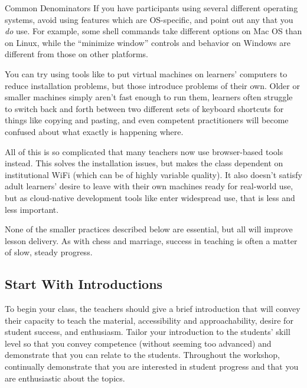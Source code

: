 \begin{aside}{Common Denominators}
  If you have participants using several different operating systems,
  avoid using features which are OS-specific, and point out any that you
  \emph{do} use. For example, some shell commands take different options on
  Mac OS than on Linux, while the ``minimize window'' controls and
  behavior on Windows are different from those on other platforms.
\end{aside}

You can try using tools like  to put virtual machines
on learners' computers to reduce installation problems, but those
introduce problems of their own. Older or smaller machines simply
aren't fast enough to run them, learners often struggle to switch back
and forth between two different sets of keyboard shortcuts for things
like copying and pasting, and even competent practitioners will become
confused about what exactly is happening where.

All of this is so complicated that many teachers now use browser-based
tools instead. This solves the installation issues, but makes the
class dependent on institutional WiFi (which can be of highly variable
quality). It also doesn't satisfy adult learners' desire to leave with
their own machines ready for real-world use, but as cloud-native
development tools like  enter widespread use, that is
less and less important.


None of the smaller practices described below are essential, but all
will improve lesson delivery. As with chess and marriage, success in
teaching is often a matter of slow, steady progress.

\subsection*{Start With Introductions}

To begin your class, the teachers should give a brief introduction that
will convey their capacity to teach the material, accessibility and
approachability, desire for student success, and enthusiasm. Tailor your
introduction to the students' skill level so that you convey competence
(without seeming too advanced) and demonstrate that you can relate to
the students. Throughout the workshop, continually demonstrate that you
are interested in student progress and that you are enthusiastic about
the topics.


